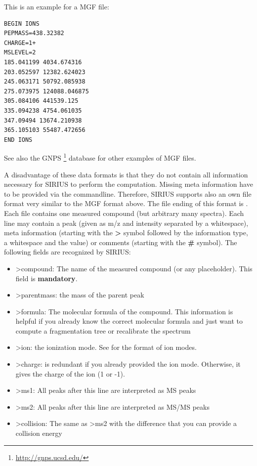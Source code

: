 \documentclass[letterpaper,10pt,openany,oneside]{sphinxmanual}
\begin{document}
This is an example for a MGF file:

\begin{Verbatim}[commandchars=\\\{\}]
BEGIN IONS
PEPMASS=438.32382
CHARGE=1+
MSLEVEL=2
185.041199 4034.674316
203.052597 12382.624023
245.063171 50792.085938
275.073975 124088.046875
305.084106 441539.125
335.094238 4754.061035
347.09494 13674.210938
365.105103 55487.472656
END IONS
\end{Verbatim}

See also the GNPS \footnote{\sphinxAtStartFootnote%
\url{http://gnps.ucsd.edu/}
} database for other examples of MGF files.

A disadvantage of these data formats is that they do not contain all information necessary for SIRIUS to perform the computation. Missing meta information have to be provided via the commandline. Therefore, SIRIUS supports also an own file format very similar to the MGF format above. The file ending of this format is . Each file contains one measured compound (but arbitrary many spectra). Each line may contain a peak (given as m/z and intensity separated by a whitespace), meta information (starting with the \textbf{\textgreater{}} symbol followed by the information type, a whitespace and the value) or comments (starting with the \textbf{\#} symbol). The following fields are recognized by SIRIUS:
\begin{itemize}
\item {} 
\textgreater{}compound: The name of the measured compound (or any placeholder). This field is \textbf{mandatory}.

\item {} 
\textgreater{}parentmass: the mass of the parent peak

\item {} 
\textgreater{}formula: The molecular formula of the compound. This
information is helpful if you already know the correct molecular formula and
just want to compute a fragmentation tree or recalibrate the spectrum

\item {} 
\textgreater{}ion: the ionization mode. See {\hyperref[commandline:ions]{}} for the format of ion modes.

\item {} 
\textgreater{}charge: is redundant if you already provided the ion mode. Otherwise, it gives the charge of the ion (1 or -1).

\item {} 
\textgreater{}ms1: All peaks after this line are interpreted as MS peaks

\item {} 
\textgreater{}ms2: All peaks after this line are interpreted as MS/MS peaks

\item {} 
\textgreater{}collision: The same as \textgreater{}ms2 with the difference that you can provide a collision energy

\end{itemize}
\end{document}
